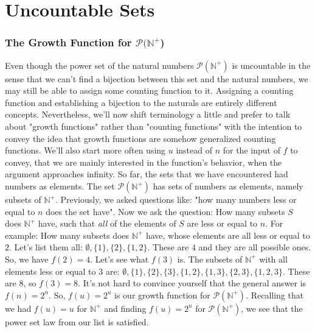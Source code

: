 \documentclass[12pt]{article}
\begin{document}
\section{Uncountable Sets}

\subsubsection{The Growth Function for $\mathcal{P}(\mathbb{N}^+$)}
Even though the power set of the natural numbers $\mathcal{P}(\mathbb{N}^+)$ is uncountable in the sense that we can't find a bijection between this set and the natural numbers, we may still be able to assign some counting function to it. Assigning a counting function and establishing a bijection to the naturals are entirely different concepts. Nevertheless, we'll now shift terminology a little and prefer to talk about "growth functions" rather than "counting functions" with the intention to convey the idea that growth functions are somehow generalized counting functions. We'll also start more often using $u$ instead of $n$ for the input of $f$ to convey, that we are mainly interested in the function's behavior, when the argument approaches infinity. So far, the sets that we have encountered had numbers as elements. The set $\mathcal{P}(\mathbb{N}^+)$ has sets of numbers as elements, namely subsets of $\mathbb{N}^+$. Previously, we asked questions like: "how many numbers less or equal to $n$ does the set have". Now we ask the question: How many subsets $S$ does $\mathbb{N}^+$ have, such that \emph{all} of the elements of $S$ are less or equal to $n$. For example: How many subsets does $\mathbb{N}^+$ have, whose elements are all less or equal to $2$. Let's list them all: $\emptyset, \{1\}, \{2\}, \{1,2\}$. These are $4$ and they are all possible ones. So, we have $f(2) = 4$. Let's see what $f(3)$ is. The subsets of $\mathbb{N}^+$ with all elements less or equal to $3$ are: $\emptyset, \{1\}, \{2\}, \{3\}, \{1,2\}, \{1,3\}, \{2,3\}, \{1,2,3\}$. These are $8$, so $f(3) = 8$. It's not hard to convince yourself that the general answer is $f(n) = 2^n$. So, $f(u) = 2^u$ is our growth function for $\mathcal{P}(\mathbb{N}^+)$. Recalling that we had $f(u) = u$ for $\mathbb{N}^+$ and finding $f(u) = 2^u$ for $\mathcal{P}(\mathbb{N}^+)$, we see that the power set law from our list is satisfied.
\end{document}

